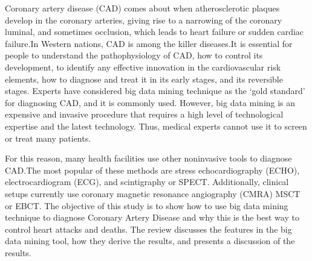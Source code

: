 Coronary artery disease (CAD) comes about when atherosclerotic plaques
develop in the coronary arteries, giving rise to a narrowing of the
coronary luminal, and sometimes occlusion, which leads to heart
failure or sudden cardiac failure.In Western nations, CAD is among the
killer diseases.It is essential for people to understand the
pathophysiology of CAD, how to control its development, to identify
any effective innovation in the cardiovascular risk elements, how to
diagnose and treat it in its early stages, and its reversible stages.
Experts have considered big data mining technique as the `gold
standard' for diagnosing CAD, and it is commonly used. However, big
data mining is an expensive and invasive procedure that 
requires a high level of technological expertise and the latest
technology. Thus, medical experts cannot use it to screen or treat
many patients. 
\par For this reason, many health facilities use other noninvasive
tools to diagnose CAD.The most popular of these methods are stress
echocardiography (ECHO), electrocardiogram (ECG), and scintigraphy or
SPECT. Additionally, clinical setups currently use coronary magnetic
resonance angiography (CMRA) MSCT or EBCT. The objective of this study
is to show how to use big data mining technique to diagnose Coronary
Artery Disease and why this is the best way to control heart attacks
and deaths. The review discusses the features in the big data mining
tool, how they derive the results, and presents a discussion of the
results.

